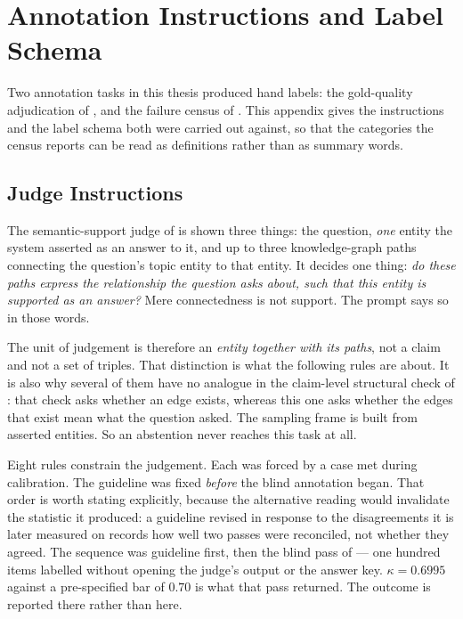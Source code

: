 \chapter{Annotation Instructions and Label Schema}\label{app:annotation}


Two annotation tasks in this thesis produced hand labels: the gold-quality
adjudication of , and the failure census of
. This appendix gives the instructions and the label
schema both were carried out against, so that the categories the census reports
can be read as definitions rather than as summary words.

\section{Judge Instructions}\label{app:judge-rules}

The semantic-support judge of  is shown three things: the
question, \emph{one} entity the system asserted as an answer to it, and up to
three knowledge-graph paths connecting the question's topic entity to that
entity. It decides one thing: \emph{do these paths express the relationship the
question asks about, such that this entity is supported as an answer?} Mere
connectedness is not support. The prompt says so in those words.

The unit of judgement is therefore an \emph{entity together with its paths}, not
a claim and not a set of triples. That distinction is what the following rules
are about. It is also why several of them have no analogue in the claim-level
structural check of : that check asks whether an edge
exists, whereas this one asks whether the edges that exist mean what the
question asked. The sampling frame is built from asserted entities. So an
abstention never reaches this task at all.

Eight rules constrain the judgement. Each was forced by a case met during
calibration. The guideline was fixed \emph{before} the blind annotation
began. That order is worth stating explicitly, because the alternative reading
would invalidate the statistic it produced: a guideline revised in response to
the disagreements it is later measured on records how well two passes were
reconciled, not whether they agreed. The sequence was guideline first, then the
blind pass of  --- one hundred items labelled without opening
the judge's output or the answer key. $\kappa = 0.6995$ against a
pre-specified bar of $0.70$ is what that pass returned. The outcome is reported
there rather than here.

